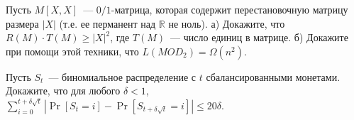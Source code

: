 \begin{ptask}{19}
    Пусть $M[X, X]$~--- $0 / 1$-матрица, которая содержит перестановочную матрицу размера $|X|$ (т.е. ее перманент над
    $\mathbb{R}$ не ноль). а) Докажите, что $R(M) \cdot T(M) \ge |X|^2$, где $T(M)$~--- число единиц в матрице. б) Докажите при
    помощи этой техники, что $L(MOD_2) = \Omega(n^2)$.
\end{ptask}


\begin{ptask}{20}
    Пусть $S_t$~--- биномиальное распределение с $t$ сбалансированными монетами. Докажите, что для любого $\delta < 1$,
    $\sum\limits_{i = 0}^{t + \delta \sqrt{t}} |\Pr[S_t = i] - \Pr[S_{t + \delta \sqrt{t}} = i]| \le 20 \delta$.
\end{ptask}
